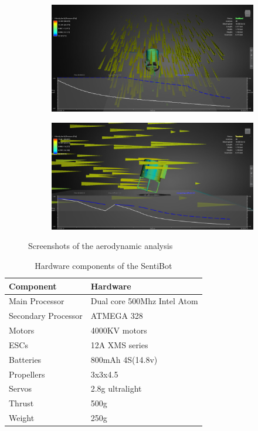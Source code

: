 \documentclass[12pt]{article}
\begin{document}
\begin{figure}[h]
	\centering
	\begin{subfigure}{0.5\textwidth}
		\centering
		\includegraphics[width=0.9\linewidth]{aerodynamic-1.png}
	\end{subfigure}
	\begin{subfigure}{0.5\textwidth}
		\centering
		\includegraphics[width=0.9\linewidth]{aerodynamic-2.png}
	\end{subfigure}
	\caption{Screenshots of the aerodynamic analysis}
	\label{fig:aerodynamic}
\end{figure}

\begin{table}[h]
	\centering
	\begin{tabular}{ | l | l | }
		Component & Hardware \\
		\hline
		Main Processor & Dual core 500Mhz Intel Atom \\
		Secondary Processor & ATMEGA 328 \\
		Motors & 4000KV motors \\
		ESCs & 12A XMS series \\
		Batteries & 800mAh 4S(14.8v) \\
		Propellers & 3x3x4.5 \\
		Servos & 2.8g ultralight \\
		Thrust & 500g \\
		Weight & 250g \\
	\end{tabular}
	\caption{Hardware components of the SentiBot}
	\label{fig:components}
\end{table}
\end{document}
